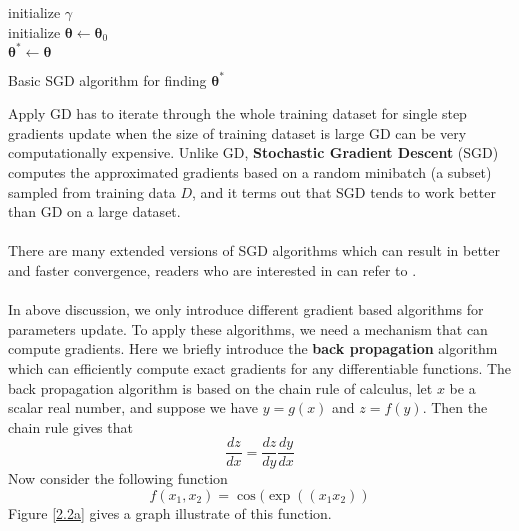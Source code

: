 \begin{algorithm}[H]
	initialize $\gamma$ \\
	initialize $\mathbf{\theta} \gets \mathbf{\theta}_{0}$ \\
	$\mathbf{\theta}^{*} \gets \mathbf{\theta}$
	\caption{Basic SGD algorithm for finding $\mathbf{\theta}^{*}$}
\end{algorithm}
\noindent
Apply GD has to iterate through the whole training dataset for single step gradients update when the size of training dataset is large GD can be very computationally expensive.
Unlike GD, \textbf{Stochastic Gradient Descent} (SGD) computes the approximated gradients based on a random minibatch (a subset) sampled from training data $D$, and it terms out that SGD tends to work better than GD on a large dataset\cite{Goodfellow2016Book}. \\\\
There are many extended versions of SGD algorithms which can result in better and faster convergence, readers who are interested in can refer to \cite{kingma2014adam,sutskever2013importance}. \\\\
In above discussion, we only introduce different gradient based algorithms for parameters update. 
To apply these algorithms, we need a mechanism that can compute gradients.
Here we briefly introduce the \textbf{back propagation} algorithm\cite{rumelhart1988learning} which can efficiently compute exact gradients for any differentiable functions.
The back propagation algorithm is based on the chain rule of calculus, let $x$ be a scalar real number, and suppose we have $y = g(x)$ and $z=f(y)$. Then the chain rule gives that
\begin{equation}
\frac{dz}{dx} = \frac{dz}{dy}\frac{dy}{dx}
\end{equation}
Now consider the following function 
\begin{equation}
f(x_{1},x_{2}) = \cos(\exp((x_{1}x_{2}))
\end{equation}
Figure \ref{2.2a} gives a graph illustrate of this function.
